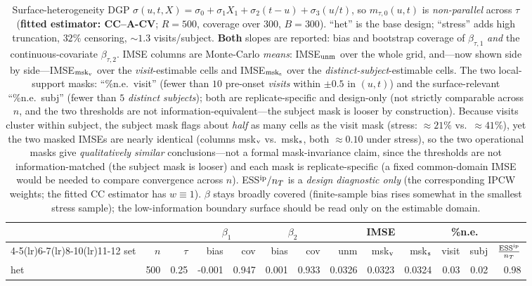 \begin{table}[t]\centering\small
\caption{Surface-heterogeneity DGP $\sigma(u,t,X)=\sigma_0+\sigma_1 X_1+\sigma_2(t-u)+\sigma_3(u/t)$, so $m_{\tau,0}(u,t)$ is \emph{non-parallel} across $\tau$ (\textbf{fitted estimator: CC--A-CV}; $R=500$, coverage over $300$, $B=300$). ``het'' is the base design; ``stress'' adds high truncation, $32\%$ censoring, $\sim1.3$ visits/subject. \textbf{Both} slopes are reported: bias and bootstrap coverage of $\beta_{\tau,1}$ \emph{and} the continuous-covariate $\beta_{\tau,2}$. IMSE columns are Monte-Carlo \emph{means}: IMSE$_{\rm unm}$ over the whole grid, and---now shown side by side---IMSE$_{\rm msk_v}$ over the \emph{visit}-estimable cells and IMSE$_{\rm msk_s}$ over the \emph{distinct-subject}-estimable cells. The two local-support masks: ``\%n.e.\ visit'' (fewer than $10$ pre-onset \emph{visits} within $\pm0.5$ in $(u,t)$) and the surface-relevant ``\%n.e.\ subj'' (fewer than $5$ \emph{distinct subjects}); both are replicate-specific and design-only (not strictly comparable across $n$, and the two thresholds are not information-equivalent---the subject mask is looser by construction). Because visits cluster within subject, the subject mask flags about \emph{half} as many cells as the visit mask (stress: $\approx21\%$ vs.\ $\approx41\%$), yet the two masked IMSEs are nearly identical (columns msk$_{\rm v}$ vs.\ msk$_{\rm s}$, both $\approx0.10$ under stress), so the two operational masks give \emph{qualitatively similar} conclusions---not a formal mask-invariance claim, since the thresholds are not information-matched (the subject mask is looser) and each mask is replicate-specific (a fixed common-domain IMSE would be needed to compare convergence across $n$). ESS$^{\rm ip}/n_T$ is a \emph{design diagnostic only} (the corresponding IPCW weights; the fitted CC estimator has $w\equiv1$). $\beta$ stays broadly covered (finite-sample bias rises somewhat in the smallest stress sample); the low-information boundary surface should be read only on the estimable domain.}
\label{tab:surface}\begin{tabular}{lrr rr rr rrr rr r}\toprule
&&&\multicolumn{2}{c}{$\beta_1$}&\multicolumn{2}{c}{$\beta_2$}&\multicolumn{3}{c}{IMSE}&\multicolumn{2}{c}{\%n.e.}&\\
\cmidrule(lr){4-5}\cmidrule(lr){6-7}\cmidrule(lr){8-10}\cmidrule(lr){11-12}
set&$n$&$\tau$&bias&cov&bias&cov&unm&msk$_{\rm v}$&msk$_{\rm s}$&visit&subj&$\tfrac{\rm ESS^{ip}}{n_T}$\\\midrule
het & 500 & 0.25 & -0.001 & 0.947 & 0.001 & 0.933 & 0.0326 & 0.0323 & 0.0324 & 0.03 & 0.02 & 0.98 \\

\end{tabular}
\end{table}

